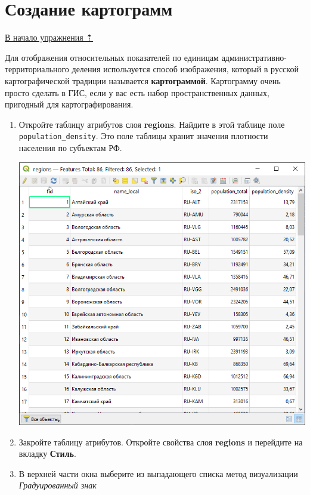 \documentclass[
  12pt,
]{book}
\begin{document}
\hypertarget{map-design-population-fill-color}{%
\section{Создание картограмм}\label{map-design-population-fill-color}}

\protect\hyperlink{map-design-population}{В начало упражнения ⇡}

Для отображения относительных показателей по единицам административно-территориального деления используется способ изображения, который в русской картографической традиции называется \textbf{картограммой}. Картограмму очень просто сделать в ГИС, если у вас есть набор пространственных данных, пригодный для картографирования.

\begin{enumerate}
\def\labelenumi{\arabic{enumi}.}
\item
  Откройте таблицу атрибутов слоя \textbf{regions}. Найдите в этой таблице поле \texttt{population\_density}. Это поле таблицы хранит значения плотности населения по субъектам РФ.

  \includegraphics{images/Ex03/attribute_table.png}
\item
  Закройте таблицу атрибутов. Откройте свойства слоя \textbf{regions} и перейдите на вкладку \textbf{Стиль}.
\item
  В верхней части окна выберите из выпадающего списка метод визуализации \emph{Градуированный знак}


\end{enumerate}
\end{document}
